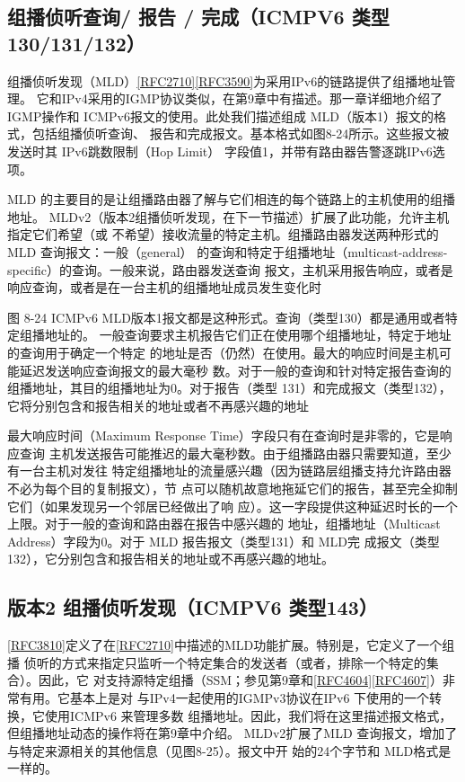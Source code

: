 \subsection{组播侦听查询/ 报告 / 完成（ICMPV6 类型 130/131/132）}
组播侦听发现（MLD）\href{https://www.rfc-editor.org/rfc/rfc2710}{[RFC2710]}\href{https://www.rfc-editor.org/rfc/rfc3590}{[RFC3590]}为采用IPv6的链路提供了组播地址管理。
它和IPv4采用的IGMP协议类似，在第9章中有描述。那一章详细地介绍了IGMP操作和
ICMPv6报文的使用。此处我们描述组成 MLD（版本1）报文的格式，包括组播侦听查询、
报告和完成报文。基本格式如图8-24所示。这些报文被发送时其 IPv6跳数限制（Hop Limit）
字段值1，并带有路由器告警逐跳IPv6选项。

MLD 的主要目的是让组播路由器了解与它们相连的每个链路上的主机使用的组播地址。
MLDv2（版本2组播侦听发现，在下一节描述）扩展了此功能，允许主机指定它们希望（或
不希望）接收流量的特定主机。组播路由器发送两种形式的 MLD 查询报文：一般（general）
的查询和特定于组播地址（multicast-address-specific）的查询。一般来说，路由器发送查询
报文，主机采用报告响应，或者是响应查询，或者是在一台主机的组播地址成员发生变化时

图 8-24 ICMPv6 MLD版本1报文都是这种形式。查询（类型130）都是通用或者特定组播地址的。
一般查询要求主机报告它们正在使用哪个组播地址，特定于地址的查询用于确定一个特定
的地址是否（仍然）在使用。最大的响应时间是主机可能延迟发送响应查询报文的最大毫秒
数。对于一般的查询和针对特定报告查询的组播地址，其目的组播地址为0。对于报告（类型
131）和完成报文（类型132），它将分别包含和报告相关的地址或者不再感兴趣的地址

最大响应时间（Maximum Response Time）字段只有在查询时是非零的，它是响应查询
主机发送报告可能推迟的最大毫秒数。由于组播路由器只需要知道，至少有一台主机对发往
特定组播地址的流量感兴趣（因为链路层组播支持允许路由器不必为每个目的复制报文），节
点可以随机故意地拖延它们的报告，甚至完全抑制它们（如果发现另一个邻居已经做出了响
应）。这一字段提供这种延迟时长的一个上限。对于一般的查询和路由器在报告中感兴趣的
地址，组播地址（Multicast Address）字段为0。对于 MLD 报告报文（类型131）和 MLD完
成报文（类型132），它分别包含和报告相关的地址或不再感兴趣的地址。

\subsection{版本2 组播侦听发现（ICMPV6 类型143）}
\href{https://www.rfc-editor.org/rfc/rfc3810}{[RFC3810]}定义了在\href{https://www.rfc-editor.org/rfc/rfc2710}{[RFC2710]}中描述的MLD功能扩展。特别是，它定义了一个组播
侦听的方式来指定只监听一个特定集合的发送者（或者，排除一个特定的集合）。因此，它
对支持源特定组播（SSM；参见第9章和\href{https://www.rfc-editor.org/rfc/rfc4604}{[RFC4604]}\href{https://www.rfc-editor.org/rfc/rfc4607}{[RFC4607]}）非常有用。它基本上是对
与IPv4一起使用的IGMPv3协议在IPv6 下使用的一个转换，它使用ICMPv6 来管理多数
组播地址。因此，我们将在这里描述报文格式，但组播地址动态的操作将在第9章中介绍。
MLDv2扩展了MLD 查询报文，增加了与特定来源相关的其他信息（见图8-25）。报文中开
始的24个字节和 MLD格式是一样的。

